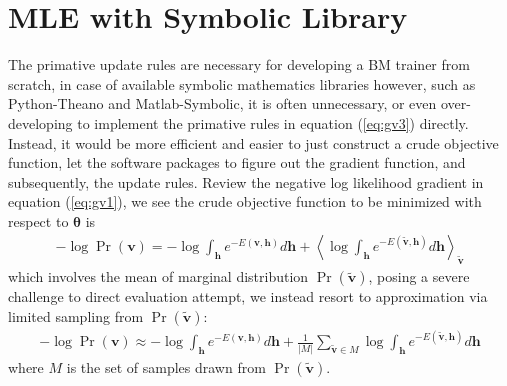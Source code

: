 \documentclass[11pt]{article}
\newcommand{\mean}[2]{\left\langle{#1}\right\rangle_{#2}}
\newcommand{\vh}{\boldsymbol{h}}
\newcommand{\vv}{\boldsymbol{v}}
\newcommand{\vvt}{\tilde{\vv}}
\newcommand{\pEC}{\boldsymbol{\theta}}
\begin{document}
{\section{MLE with Symbolic Library}
The primative update rules are necessary for developing a BM trainer from scratch, in case of available symbolic mathematics libraries however, such as Python-Theano and Matlab-Symbolic, it is often unnecessary, or even over-developing to implement the primative rules in equation (\ref{eq:gv3}) directly. Instead, it would be more efficient and easier to just construct a crude objective function, let the software packages to figure out the gradient function, and subsequently, the update rules.
Review the negative log likelihood gradient in equation (\ref{eq:gv1}), we see the crude objective function to be minimized with respect to $\pEC$ is
\begin{align}\label{eq:l(v)1}
  -\log{\Pr(\vv)} = -\log{\int_{\vh}{e^{-E(\vv, \vh)}d\vh}} + \mean{\log{\int_{\vh}{e^{-E(\vvt, \vh)}d\vh}}}{\vvt}
\end{align}
which involves the mean of marginal distribution $\Pr(\vvt)$, posing a severe challenge to direct evaluation attempt, we instead resort to approximation via limited sampling from $\Pr(\vvt)$:
\begin{align}\label{eq:l(v)2}
  -\log{\Pr(\vv)} \approx -\log{\int_{\vh} e^{-E(\vv, \vh)} d\vh} + \frac{1}{|M|}\sum_{\vvt \in M}{\log{\int_{\vh} e^{-E(\vvt, \vh)}d\vh}}
\end{align}
where $M$ is the set of samples drawn from $\Pr(\vvt)$. \\
}
\end{document}
